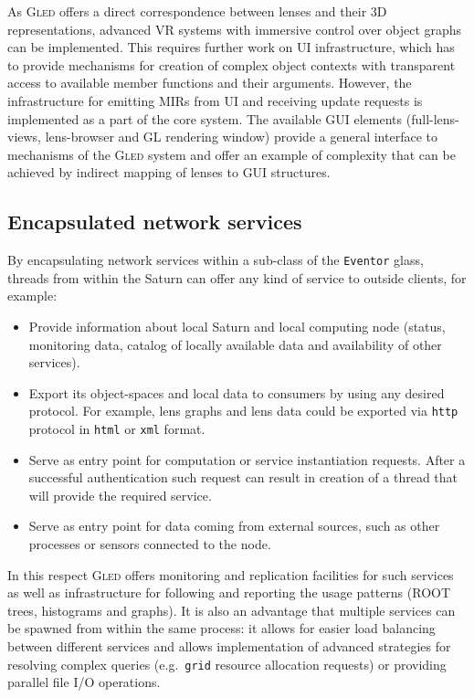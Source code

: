 \documentclass[final]{siamltex}
\def\gled{\textsc{Gled}\xspace}
\def\grid{\texttt{grid}\xspace}
\def\smalltt#1{{\small\texttt{#1}}}
\begin{document}
As \gled offers a direct correspondence between lenses and their 3D
representations, advanced VR systems with immersive control over
object graphs can be implemented. This requires further work on UI
infrastructure, which has to provide mechanisms for creation of
complex object contexts with transparent access to available member
functions and their arguments. However, the infrastructure for
emitting MIRs from UI and receiving update requests is implemented as
a part of the core system. The available GUI elements
(full-lens-views, lens-browser and GL rendering window) provide a
general interface to mechanisms of the \gled system and offer an
example of complexity that can be achieved by indirect mapping of
lenses to GUI structures.

\subsection{Encapsulated network services}

By encapsulating network services with\-in a sub-class of the
\smalltt{Eventor} glass, threads from within the Saturn can offer any
kind of service to outside clients, for example:
\begin{itemize}
\item Provide information about local Saturn and local computing node
  (status, monitoring data, catalog of locally available data and
  availability of other services).
\item Export its object-spaces and local data to consumers by using
  any desired protocol. For example, lens graphs and lens data could
  be exported via \smalltt{http} protocol in \smalltt{html} or
  \smalltt{xml} format.
\item Serve as entry point for computation or service instantiation
  requests. After a successful authentication such request can result
  in creation of a thread that will provide the required service.
\item Serve as entry point for data coming from external sources, such
  as other processes or sensors connected to the node.
\end{itemize}

In this respect \gled offers monitoring and replication facilities for
such services as well as infrastructure for following and reporting
the usage patterns (ROOT trees, histograms and graphs). It is also an
advantage that multiple services can be spawned from within the same
process: it allows for easier load balancing between different
services and allows implementation of advanced strategies for
resolving complex queries (e.g.\ \grid resource allocation requests) or
providing parallel file I/O operations.
\end{document}
